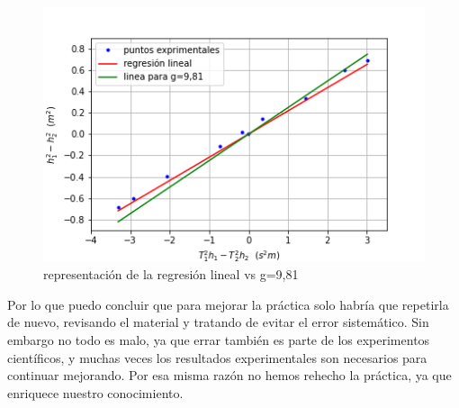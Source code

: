 \documentclass[12pt,a4paper]{book}
\begin{document}
\begin{figure}[h!]
\centering
\includegraphics[scale=0.8]{Plot2-kater.png}
\caption{representación de la regresión lineal vs g=9,81}
\label{fig:Plot2-kater}
\end{figure}

Por lo que puedo concluir que para mejorar la práctica solo habría que repetirla de nuevo, revisando el material y tratando de evitar el error sistemático.  Sin embargo no todo es malo, ya que errar también es parte de los experimentos científicos, y muchas veces los resultados experimentales son necesarios para continuar mejorando. Por esa misma razón no hemos rehecho la práctica, ya que enriquece nuestro conocimiento.
\end{document}
